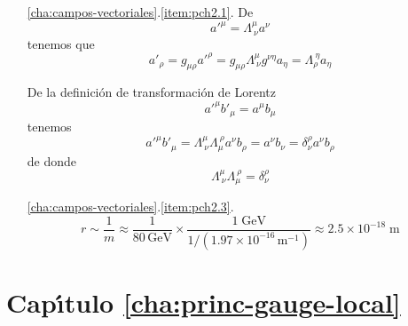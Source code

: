 \begin{itemize}
\item[\ref{cha:campos-vectoriales}.\ref{item:pch2.1}.] De
\begin{equation}
  {a'}^\mu=\Lambda^{\mu}_{\ \nu}a^\nu
\end{equation}
tenemos que
\begin{equation}
  {a'}_\rho=g_{\mu\rho}{a'}^\rho=g_{\mu\rho}\Lambda^{\mu}_{\ \nu}g^{\nu\eta}a_\eta=\Lambda^{\ \eta}_{\rho}a_\eta
\end{equation}

De la definici\'on de transformaci\'on de Lorentz
\begin{equation}
  {a'}^{\mu}{b'}_\mu=a^{\mu}b_\mu
\end{equation}
tenemos
\begin{equation}
   {a'}^{\mu}{b'}_\mu=\Lambda^{\mu}_{\ \nu}\Lambda_{\mu}^{\ \rho}a^{\nu}b_\rho=a^\nu b_\nu=\delta^\rho_\nu a^\nu b_\rho
\end{equation}
de donde
\begin{equation}
  \Lambda^{\mu}_{\ \nu}\Lambda_{\mu}^{\ \rho}=\delta^\rho_\nu
\end{equation}

\item[\ref{cha:campos-vectoriales}.\ref{item:pch2.3}.] 
\begin{equation}
  r\sim\frac{1}{m}\approx\frac{1}{80\,\text{GeV}}\times\frac{1\;\text{GeV}}{1/(1.97\times10^{-16}\,\text{m}^{-1})}\approx2.5\times10^{-18}\;\text{m}
\end{equation}

\end{itemize}

\section*{Cap\'\i tulo \ref{cha:princ-gauge-local}}

